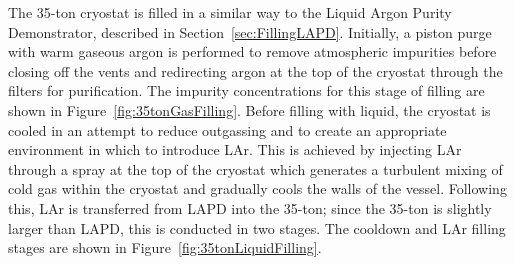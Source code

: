 The 35-ton cryostat is filled in a similar way to the Liquid Argon Purity Demonstrator, described in Section~\ref{sec:FillingLAPD}.  Initially, a piston purge with warm gaseous argon is performed to remove atmospheric impurities before closing off the vents and redirecting argon at the top of the cryostat through the filters for purification.  The impurity concentrations for this stage of filling are shown in Figure~\ref{fig:35tonGasFilling}.  Before filling with liquid, the cryostat is cooled in an attempt to reduce outgassing and to create an appropriate environment in which to introduce LAr.  This is achieved by injecting LAr through a spray at the top of the cryostat which generates a turbulent mixing of cold gas within the cryostat and gradually cools the walls of the vessel.  Following this, LAr is transferred from LAPD into the 35-ton; since the 35-ton is slightly larger than LAPD, this is conducted in two stages.  The cooldown and LAr filling stages are shown in Figure~\ref{fig:35tonLiquidFilling}.

